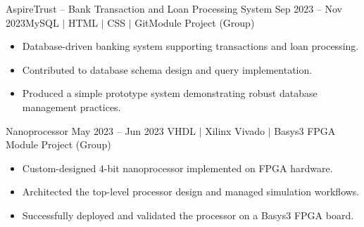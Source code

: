 \resumeSubheading
{AspireTrust -- Bank Transaction and Loan Processing System \href{https://github.com/AkinduID/AspireTrust}{\faGithub}}{Sep 2023 -- Nov 2023}{MySQL $|$ HTML $|$ CSS $|$ Git}{Module Project (Group)}
\begin{itemize}
    \item Database-driven banking system supporting transactions and loan processing.
    \item Contributed to database schema design and query implementation.
    \item Produced a simple prototype system demonstrating robust database management practices.
\end{itemize}

\resumeSubheading
{Nanoprocessor \href{https://github.com/AkinduID/Nano-Processor-Final}{\faGithub}}{May 2023 -- Jun 2023}
{VHDL $|$ Xilinx Vivado $|$ Basys3 FPGA }{Module Project (Group)}
\begin{itemize}
    \item Custom-designed 4-bit nanoprocessor implemented on FPGA hardware.
    \item Architected the top-level processor design and managed simulation workflows.
    \item Successfully deployed and validated the processor on a Basys3 FPGA board.
\end{itemize}

\resumeSubHeadingListEnd
\vspace{3pt}
